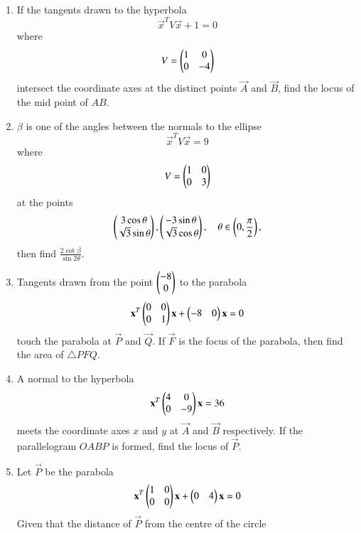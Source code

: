 \documentclass[journal,12pt,twocolumn]{IEEEtran}
\begin{document}
\begin{enumerate}[label=\arabic*.]
%
\item If the tangents drawn to the hyperbola 
\begin{equation}
\vec{x}^TV\vec{x} +1=0
\end{equation}
%
where
\begin{equation}
V = \begin{pmatrix}1 & 0 \\ 0 & -4\end{pmatrix}
\end{equation}
%
intersect the coordinate axes at the distinct points $\vec{A}$ and $\vec{B}$, find the locus of the mid point 
of $AB$.
\item $\beta$ is one of the angles between the normals to the ellipse
\begin{equation}
\vec{x}^TV\vec{x} =9
\end{equation}
%
where
\begin{equation}
V = \begin{pmatrix}1 & 0 \\ 0 & 3\end{pmatrix}
\end{equation}
%
at the points
\begin{equation}
\begin{pmatrix}3\cos\theta\\ \sqrt{3}\sin \theta\end{pmatrix},
\begin{pmatrix}-3\sin\theta\\ \sqrt{3}\cos \theta\end{pmatrix}, \quad \theta \in \left(0,\frac{\pi}{2}\right),
\end{equation}
then find $\frac{2\cot \beta}{\sin 2\theta}$.
\item Tangents drawn from the point $\begin{pmatrix}-8\\0\end{pmatrix}$ to the parabola
\begin{equation}
\mathbf{x}^T\begin{pmatrix}0 & 0 \\ 0 & 1\end{pmatrix}\mathbf{x} + \begin{pmatrix}-8 & 0\end{pmatrix}\mathbf{x} 
 = 0
\end{equation}
%
touch the parabola at $\vec{P}$ and  $\vec{Q}$. If $\vec{F}$ is the focus of the parabola, then find the area 
of $\triangle PFQ$.
\item A normal to the hyperbola 
\begin{equation}
\mathbf{x}^T\begin{pmatrix}4 & 0 \\ 0 & -9\end{pmatrix}\mathbf{x} 
 = 36
\end{equation}
%
meets the coordinate axes $x$ and $y$ at $\vec{A}$ and $\vec{B}$ respectively.  If the parallelogram $OABP$ is 
formed, find the locus of $\vec{P}$.
\item Let $\vec{P}$ 
be the parabola
\begin{equation}
\mathbf{x}^T\begin{pmatrix}1 & 0 \\ 0 & 0\end{pmatrix}\mathbf{x} +\begin{pmatrix}0 & 4 \end{pmatrix}\mathbf{x} 
 = 0
\end{equation}
Given that the distance of $\vec{P}$ from the centre of the circle

\end{enumerate}
\end{document}
